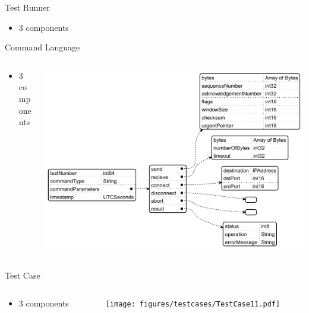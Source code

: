 \documentclass[showdate=true, slidenumbers=slide]{beamerruhuisstijl169}
\begin{document}
\begin{frame}{Test Runner}
    \begin{itemize}
        \item 3 components
    \end{itemize}
\end{frame}

\begin{frame}{Command Language}
    \begin{columns}[T,totalwidth=\linewidth]
        \begin{column}{0.5\textwidth}
            \begin{itemize}
                \item 3 components
            \end{itemize}
        \end{column}
        \begin{column}{0.5\textwidth}
            \includegraphics[width=\textwidth]{figures/ControlMessagesJson.pdf}
        \end{column}
    \end{columns}
\end{frame}

\begin{frame}{Test Case}
    \begin{columns}
        \begin{column}{0.5\textwidth}
            \begin{itemize}
                \item 3 components
            \end{itemize}
        \end{column}
        \begin{column}{0.5\textwidth}
            \texttt{[image: figures/testcases/TestCase11.pdf]}
        \end{column}
    \end{columns}
\end{frame}
\end{document}

